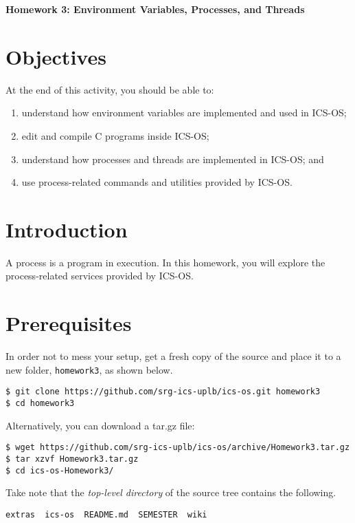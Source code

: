 \documentclass[a4paper, 11pt,oneside]{article}
\begin{document}
\begin{center}
   {\LARGE \textbf{Homework 3: Environment Variables, Processes, and Threads}}
\end{center}

\section*{Objectives}
   At the end of this activity, you should be able to:
   \begin{enumerate}[itemsep=0pt,parsep=0pt]
       \item understand how environment variables are implemented and used in ICS-OS;
       \item edit and compile C programs inside ICS-OS;
       \item understand how processes and threads are implemented in ICS-OS; and
       \item use process-related commands and utilities provided by ICS-OS.
   \end{enumerate}   

\section{Introduction}
A process is a program in execution. In this homework, you will explore the process-related services provided by ICS-OS. 

\section{Prerequisites}
In order not to mess your setup, get a fresh copy of the source and place it to a new folder, \texttt{homework3}, as shown below. 
\begin{Verbatim}[frame=single]
$ git clone https://github.com/srg-ics-uplb/ics-os.git homework3
$ cd homework3
\end{Verbatim}

Alternatively, you can download a tar.gz file:

\begin{Verbatim}[frame=single]
$ wget https://github.com/srg-ics-uplb/ics-os/archive/Homework3.tar.gz
$ tar xzvf Homework3.tar.gz
$ cd ics-os-Homework3/
\end{Verbatim}


Take note that the \textit{top-level directory} of the source 
tree contains the following. 

\begin{Verbatim}[frame=single]
extras  ics-os  README.md  SEMESTER  wiki 
\end{Verbatim}
\end{document}
